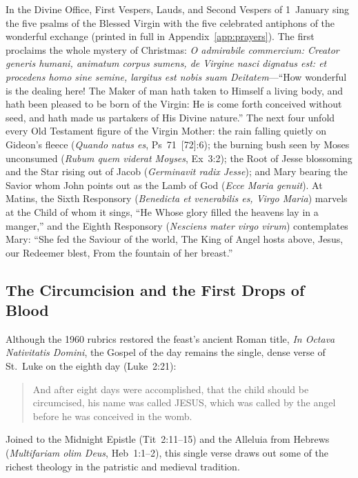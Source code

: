 In the Divine Office, First Vespers, Lauds, and Second Vespers of 1~January
sing the five psalms of the Blessed Virgin with the five celebrated antiphons
of the wonderful exchange (printed in full in Appendix~\ref{app:prayers}). The
first proclaims the whole mystery of Christmas: \textit{O admirabile commercium:
Creator generis humani, animatum corpus sumens, de Virgine nasci dignatus est:
et procedens homo sine semine, largitus est nobis suam Deitatem}---``How
wonderful is the dealing here! The Maker of man hath taken to Himself a living
body, and hath been pleased to be born of the Virgin: He is come forth conceived
without seed, and hath made us partakers of His Divine nature.'' The next four
unfold every Old Testament figure of the Virgin Mother: the rain falling quietly
on Gideon's fleece (\textit{Quando natus es}, Ps~71~[72]:6); the burning bush
seen by Moses unconsumed (\textit{Rubum quem viderat Moyses}, Ex~3:2); the Root
of Jesse blossoming and the Star rising out of Jacob (\textit{Germinavit radix
Jesse}); and Mary bearing the Savior whom John points out as the Lamb of God
(\textit{Ecce Maria genuit}). At Matins, the Sixth Responsory
(\textit{Benedicta et venerabilis es, Virgo Maria}) marvels at the Child of whom
it sings, ``He Whose glory filled the heavens lay in a manger,'' and the Eighth
Responsory (\textit{Nesciens mater virgo virum}) contemplates Mary: ``She fed
the Saviour of the world, The King of Angel hosts above, Jesus, our Redeemer
blest, From the fountain of her breast.''

\subsection{The Circumcision and the First Drops of Blood}

Although the 1960 rubrics restored the feast's ancient Roman title, \textit{In
Octava Nativitatis Domini}, the Gospel of the day remains the single, dense
verse of St.~Luke on the eighth day (Luke~2:21):

\begin{quote}
And after eight days were accomplished, that the child should be circumcised,
his name was called JESUS, which was called by the angel before he was conceived
in the womb.
\end{quote}

Joined to the Midnight Epistle (Tit~2:11--15) and the Alleluia from Hebrews
(\textit{Multifariam olim Deus}, Heb~1:1--2), this single verse draws out some
of the richest theology in the patristic and medieval tradition.

